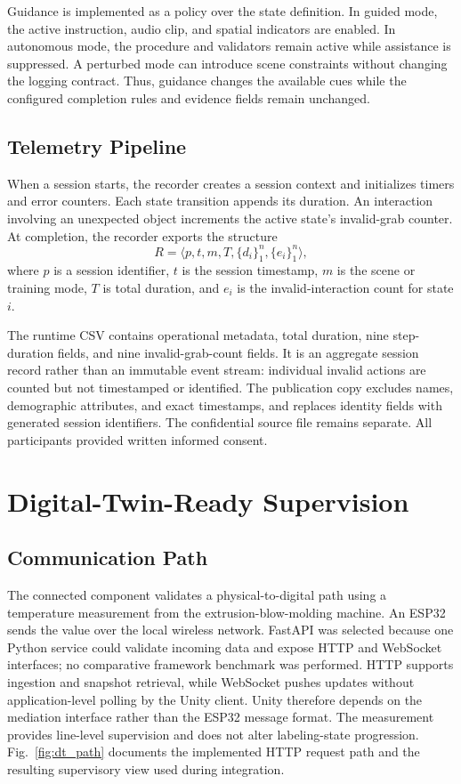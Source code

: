 \documentclass[conference]{IEEEtran}
\begin{document}
Guidance is implemented as a policy over the state definition. In guided mode, the active instruction, audio clip, and spatial indicators are enabled. In autonomous mode, the procedure and validators remain active while assistance is suppressed. A perturbed mode can introduce scene constraints without changing the logging contract. Thus, guidance changes the available cues while the configured completion rules and evidence fields remain unchanged.

\subsection{Telemetry Pipeline}

When a session starts, the recorder creates a session context and initializes timers and error counters. Each state transition appends its duration. An interaction involving an unexpected object increments the active state's invalid-grab counter. At completion, the recorder exports the structure
\begin{equation}
R=\langle p,t,m,T,\{d_i\}_{1}^{n},\{e_i\}_{1}^{n}\rangle,
\end{equation}
where $p$ is a session identifier, $t$ is the session timestamp, $m$ is the scene or training mode, $T$ is total duration, and $e_i$ is the invalid-interaction count for state $i$.

The runtime CSV contains operational metadata, total duration, nine step-duration fields, and nine invalid-grab-count fields. It is an aggregate session record rather than an immutable event stream: individual invalid actions are counted but not timestamped or identified. The publication copy excludes names, demographic attributes, and exact timestamps, and replaces identity fields with generated session identifiers. The confidential source file remains separate. All participants provided written informed consent.

\section{Digital-Twin-Ready Supervision}

\subsection{Communication Path}

The connected component validates a physical-to-digital path using a temperature measurement from the extrusion-blow-molding machine. An ESP32 sends the value over the local wireless network. FastAPI was selected because one Python service could validate incoming data and expose HTTP and WebSocket interfaces; no comparative framework benchmark was performed. HTTP supports ingestion and snapshot retrieval, while WebSocket pushes updates without application-level polling by the Unity client. Unity therefore depends on the mediation interface rather than the ESP32 message format. The measurement provides line-level supervision and does not alter labeling-state progression. Fig.~\ref{fig:dt_path} documents the implemented HTTP request path and the resulting supervisory view used during integration.
\end{document}
